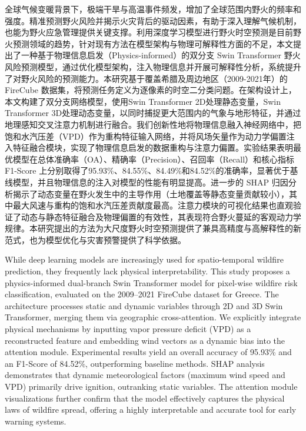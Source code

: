 \fancyheadlineonly

\begin{cabstract}
\kaishu

全球气候变暖背景下，极端干旱与高温事件频发，增加了全球范围内野火的频率和强度。精准预测野火风险并揭示火灾背后的驱动因素，有助于深入理解气候机制，也能为野火应急管理提供关键支撑。利用深度学习模型进行野火时空预测是目前野火预测领域的趋势，针对现有方法在模型架构与物理可解释性方面的不足，本文提出了一种基于物理信息启发（Physics-informed）的双分支 Swin Transformer 野火风险预测模型，通过优化模型架构，注入物理信息并开展可解释性分析，系统提升了对野火风险的预测能力。本研究基于覆盖希腊及周边地区（2009-2021年）的 FireCube 数据集，将预测任务定义为逐像素的时空二分类问题。在架构设计上，本文构建了双分支网络模型，使用Swin Transformer 2D处理静态变量，Swin Transformer 3D处理动态变量，以同时捕捉更大范围内的气象与地形特征，并通过地理感知交叉注意力机制进行融合。我们创新性地将物理信息融入神经网络中，把饱和水汽压差（VPD）作为重构特征输入网络，并将风场矢量作为动力学偏置注入特征融合模块，实现了物理信息启发的数据重构与注意力偏置。实验结果表明最优模型在总体准确率（OA）、精确率（Precision）、召回率（Recall）和核心指标 F1-Score 上分别取得了95.93\%、84.55\%、84.49\%和84.52\%的准确率，显著优于基线模型，并且物理信息的注入对模型的性能有明显提高。进一步的 SHAP 归因分析揭示了动态变量在野火发生中的主导作用（土地覆盖等静态变量贡献较小），其中最大风速与重构的饱和水汽压差贡献度最高。注意力模块的可视化结果也直观验证了动态与静态特征融合及物理偏置的有效性，其表现符合野火蔓延的客观动力学规律。本研究提出的方法为大尺度野火时空预测提供了兼具高精度与高解释性的新范式，也为模型优化与灾害预警提供了科学依据。

\end{cabstract}

\begin{eabstract}
While deep learning models are increasingly used for spatio-temporal wildfire prediction, they frequently lack physical interpretability. This study proposes a physics-informed dual-branch Swin Transformer model for pixel-wise wildfire risk classification, evaluated on the 2009–2021 FireCube dataset for Greece. The architecture processes static and dynamic variables through 2D and 3D Swin Transformer, merging them via geographic cross-attention. We explicitly integrate physical mechanisms by inputting vapor pressure deficit (VPD) as a reconstructed feature and embedding wind vectors as a dynamic bias into the attention module. Experimental results yield an overall accuracy of 95.93\% and an F1-Score of 84.52\%, outperforming baseline methods. SHAP analysis demonstrates that dynamic meteorological factors (maximum wind speed and VPD) primarily drive ignition, outranking static variables. The attention module visualizations further confirm that the model effectively captures the physical laws of wildfire spread, offering a highly interpretable and accurate tool for early warning systems.

\end{eabstract}

\fancyempty